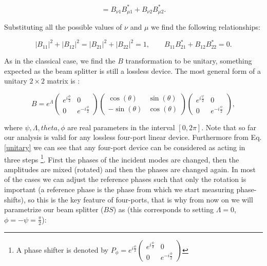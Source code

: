 \documentclass{book}
\begin{document}
\begin{equation}
   [\mathbf{a}'_{\nu},\mathbf{a}'^{\dagger}_{\mu}]=B_{\nu 1} B_{\mu 1}^{*}+B_{\nu 2} B_{\mu 2}^{*} .
\end{equation}

Substituting all the possible values of $\nu$ and $\mu$ we find the following relationships:

\begin{equation}
|B_{11}|^{2}+|B_{12}|^{2}=|B_{21}|^{2}+|B_{22}|^{2}=1 ,\qquad B_{11} B_{21}^{*}+B_{12} B_{22}^{*}=0.
\end{equation}

As in the classical case, we find the $B$ transformation to be unitary, something expected as the beam splitter is still a lossless device. The most general form of a unitary $2\times2$ matrix is \cite{leonhardt}:


\begin{equation}
B=e^{\Lambda} \begin{pmatrix} e^{i\frac{\phi}{2}} & 0 \\ 0 & e^{-i\frac{\phi}{2}} \end{pmatrix} \begin{pmatrix} \cos(\theta) &  \sin(\theta) \\ - \sin(\theta) & \cos(\theta) \end{pmatrix} \begin{pmatrix} e^{i\frac{\psi}{2}} & 0 \\ 0 & e^{-i\frac{\psi}{2}} \end{pmatrix} \label{unitary},
\end{equation}

where $\psi,\Lambda,theta,\phi$ are real parameters in the interval $[0,2\pi]$. Note that so far our analysis is valid for any lossless four-port linear device. Furthermore from Eq. \ref{unitary} we can see that any four-port device can be considered as acting in three steps \footnote{A phase shifter is denoted by $P_{\phi}=e^{i \frac{\phi}{2}}\begin{pmatrix}e^{i \frac{\phi}{2}} & 0 \\0 & e^{-i \frac{\phi}{2}} \end{pmatrix}$}. First the phases of the incident modes are changed, then the amplitudes are mixed (rotated) and then the phases are changed again. In most of the cases we can adjust the reference phases such that only the rotation is important (a reference phase is the phase from which we start measuring phase-shifts), so this is the key feature of four-ports, that is why from now on we will parametrize our beam splitter ($BS$) as (this corresponds to  setting $\Lambda=0$, $\phi=-\psi=\frac{\pi}{2}$):
\end{document}
